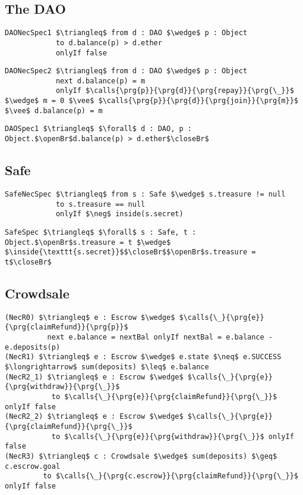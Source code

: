 \subsection{The DAO}
\label{ss:DAO}

\begin{lstlisting}[language = Chainmail, mathescape=true, frame=lines]
DAONecSpec1 $\triangleq$ from d : DAO $\wedge$ p : Object
            to d.balance(p) > d.ether
            onlyIf false
\end{lstlisting}
\begin{lstlisting}[language = Chainmail, mathescape=true, frame=lines]
DAONecSpec2 $\triangleq$ from d : DAO $\wedge$ p : Object
            next d.balance(p) = m
            onlyIf $\calls{\prg{p}}{\prg{d}}{\prg{repay}}{\prg{\_}}$ $\wedge$ m = 0 $\vee$ $\calls{\prg{p}}{\prg{d}}{\prg{join}}{\prg{m}}$ $\vee$ d.balance(p) = m
\end{lstlisting}

\begin{lstlisting}[language = Chainmail, mathescape=true, frame=lines]
DAOSpec1 $\triangleq$ $\forall$ d : DAO, p : Object.$\openBr$d.balance(p) > d.ether$\closeBr$
\end{lstlisting}

\subsection{Safe}
\label{ss:Safe}


\begin{lstlisting}[language = Chainmail, mathescape=true, frame=lines]
SafeNecSpec $\triangleq$ from s : Safe $\wedge$ s.treasure != null
            to s.treasure == null
            onlyIf $\neg$ inside(s.secret)
\end{lstlisting}
\begin{lstlisting}[language = Chainmail, mathescape=true, frame=lines]
SafeSpec $\triangleq$ $\forall$ s : Safe, t : Object.$\openBr$s.treasure = t $\wedge$ $\inside{\texttt{s.secret}}$$\closeBr$$\openBr$s.treasure = t$\closeBr$
\end{lstlisting}


\subsection{Crowdsale}
\label{ss:Crowdsale}
\begin{lstlisting}[mathescape=true, language=chainmail]
(NecR0) $\triangleq$ e : Escrow $\wedge$ $\calls{\_}{\prg{e}}{\prg{claimRefund}}{\prg{p}}$
          next e.balance = nextBal onlyIf nextBal = e.balance - e.deposits(p)
(NecR1) $\triangleq$ e : Escrow $\wedge$ e.state $\neq$ e.SUCCESS $\longrightarrow$ sum(deposits) $\leq$ e.balance
(NecR2_1) $\triangleq$ e : Escrow $\wedge$ $\calls{\_}{\prg{e}}{\prg{withdraw}}{\prg{\_}}$
           to $\calls{\_}{\prg{e}}{\prg{claimRefund}}{\prg{\_}}$ onlyIf false
(NecR2_2) $\triangleq$ e : Escrow $\wedge$ $\calls{\_}{\prg{e}}{\prg{claimRefund}}{\prg{\_}}$
           to $\calls{\_}{\prg{e}}{\prg{withdraw}}{\prg{\_}}$ onlyIf false
(NecR3) $\triangleq$ c : Crowdsale $\wedge$ sum(deposits) $\geq$ c.escrow.goal
         to $\calls{\_}{\prg{c.escrow}}{\prg{claimRefund}}{\prg{\_}}$ onlyIf false
\end{lstlisting}


